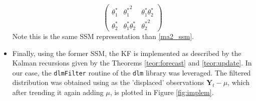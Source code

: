 \documentclass{article}
\theoremstyle{definition}
\theoremstyle{definition}
\theoremstyle{remark}
\theoremstyle{mythmstyle}
\begin{document}
\begin{itemize}
\begin{equation}
\begin{pmatrix}
      \theta_1^* & {\theta_1^*}^2 & \theta_1^* \theta_2^* \\ 
      \theta_2^* & \theta_1^* \theta_2^* & {\theta_2^*}^2
     \end{pmatrix}
    \end{equation} Note this is the same SSM representation than \ref{ma2_ssm}.
    \item Finally, using the former SSM, the KF is implemented as described by the Kalman recursions given by the Theorems \ref{teor:forecast} and \ref{teor:update}. In our case, the \texttt{dlmFilter} routine of the \texttt{dlm} library was leveraged. The filtered distribution was obtained using as the 'displaced' observations $\bm{Y}_t - \mu $, which after trending it again adding $\mu$, is plotted in Figure \ref{fig:implem}.
\end{itemize}
\end{document}
